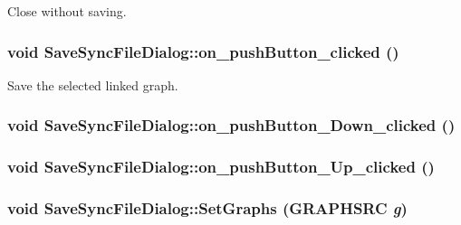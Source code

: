 Close without saving. 

\hypertarget{class_save_sync_file_dialog_5e3b844df3fe3b657e3fac9b590a690c}{
\subsubsection[{on\_\-pushButton\_\-clicked}]{\setlength{\rightskip}{0pt plus 5cm}void SaveSyncFileDialog::on\_\-pushButton\_\-clicked ()}}
\label{class_save_sync_file_dialog_5e3b844df3fe3b657e3fac9b590a690c}


Save the selected linked graph. 

\hypertarget{class_save_sync_file_dialog_ac104e51524129c824ab1d30b8ae9e14}{
\subsubsection[{on\_\-pushButton\_\-Down\_\-clicked}]{\setlength{\rightskip}{0pt plus 5cm}void SaveSyncFileDialog::on\_\-pushButton\_\-Down\_\-clicked ()}}
\label{class_save_sync_file_dialog_ac104e51524129c824ab1d30b8ae9e14}


\hypertarget{class_save_sync_file_dialog_1cb3cdad261dd621d2d1e1d3a538fefb}{
\subsubsection[{on\_\-pushButton\_\-Up\_\-clicked}]{\setlength{\rightskip}{0pt plus 5cm}void SaveSyncFileDialog::on\_\-pushButton\_\-Up\_\-clicked ()}}
\label{class_save_sync_file_dialog_1cb3cdad261dd621d2d1e1d3a538fefb}


\hypertarget{class_save_sync_file_dialog_323d6d3c60360e40871f961d000a7940}{
\subsubsection[{SetGraphs}]{\setlength{\rightskip}{0pt plus 5cm}void SaveSyncFileDialog::SetGraphs ({\bf GRAPHSRC} {\em g})}}
\label{class_save_sync_file_dialog_323d6d3c60360e40871f961d000a7940}




